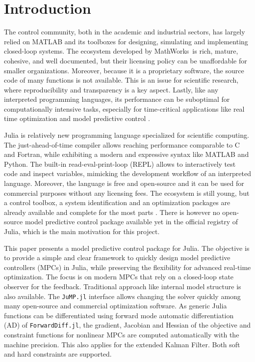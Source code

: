 \section{Introduction}

The control community, both in the academic and industrial sectors, has largely relied on MATLAB and its toolboxes for designing, simulating and implementing closed-loop systems. The ecosystem developed by MathWorks\texttrademark\ is rich, mature, cohesive, and well documented, but their licensing policy can be unaffordable for smaller organizations. Moreover, because it is a proprietary software, the source code of many functions is not available. This is an issue for scientific research, where reproducibility and transparency is a key aspect. Lastly, like any interpreted programming languages, its performance can be suboptimal for computationally intensive tasks, especially for time-critical applications like real time optimization and model predictive control \citep{matlabPythonJulia}.

Julia is relatively new programming language specialized for scientific computing. The just-ahead-of-time compiler allows reaching performance comparable to C and Fortran, while exhibiting a modern and expressive syntax like MATLAB and Python. The built-in read-eval-print-loop (REPL) allows to interactively test code and inspect variables, mimicking the development workflow of an interpreted language. Moreover, the language is free and open-source and it can be used for commercial purposes without any licensing fees. The ecosystem is still young, but a control toolbox, a system identification and an optimization packages are already available and complete for the most parts \citep{controlsystems_jl, jump_jl}. There is however no open-source model predictive control package available yet in the official registry of Julia, which is the main motivation for this project.

This paper presents a model predictive control package for Julia. The objective is to provide a simple and clear framework to quickly design model predictive controllers (MPCs) in Julia, while preserving the flexibility for advanced real-time optimization. The focus is on modern MPCs that rely on a closed-loop state observer for the feedback. Traditional approach like internal model structure is also available. The \texttt{JuMP.jl} interface allows changing the solver quickly among  many open-source and commercial optimization software. As generic Julia functions can be differentiated using forward mode automatic differentiation (AD) of \texttt{ForwardDiff.jl}, the gradient, Jacobian and Hessian of the objective and constraint functions for nonlinear MPCs are computed automatically with the machine precision. This also applies for the extended Kalman Filter. Both soft and hard constraints are supported. 

